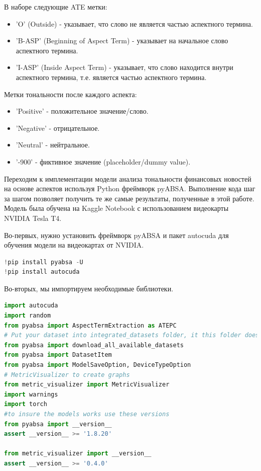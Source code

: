 В наборе следующие ATE метки:
\begin{itemize}
    \item 'O' (Outside) - указывает, что слово не является частью аспектного термина.
    \item 'B-ASP' (Beginning of Aspect Term) - указывает на начальное слово аспектного термина.
    \item 'I-ASP' (Inside Aspect Term) - указывает, что слово находится внутри аспектного термина, т.е. является частью аспектного термина.
\end{itemize}
Метки тональности после каждого аспекта:
\begin{itemize}
    \item 'Positive' - положительное значение/слово.
    \item 'Negative' - отрицательное.
    \item 'Neutral' - нейтральное.
    \item '-900' - фиктивное значение (placeholder/dummy value).
\end{itemize}

Переходим к имплементации модели анализа тональности финансовых новостей на основе аспектов используя Python фреймворк pyABSA. Выполнение кода шаг за шагом позволяет получить те же самые результаты, полученные в этой работе. Модель была обучена на Kaggle Notebook с использованием видеокарты NVIDIA Tesla T4.

Во-первых, нужно установить фреймворк pyABSA и пакет autocuda для обучения модели на видеокартах от NVIDIA. 
\begin{lstlisting}[label=listing1, caption=установка фреймворка, language = Python]
!pip install pyabsa -U
!pip install autocuda
\end{lstlisting}

Во-вторых, мы импортируем необходимые библиотеки.
\begin{lstlisting}[label=listing2, caption=установка фреймворка, language = Python]
import autocuda
import random
from pyabsa import AspectTermExtraction as ATEPC
# Put your dataset into integrated_datasets folder, it this folder does not exist, you need to call:
from pyabsa import download_all_available_datasets
from pyabsa import DatasetItem
from pyabsa import ModelSaveOption, DeviceTypeOption
# MetricVisualizer to create graphs
from metric_visualizer import MetricVisualizer
import warnings
import torch
#to insure the models works use these versions
from pyabsa import __version__
assert __version__ >= '1.8.20'

from metric_visualizer import __version__
assert __version__ >= '0.4.0'
\end{lstlisting}

